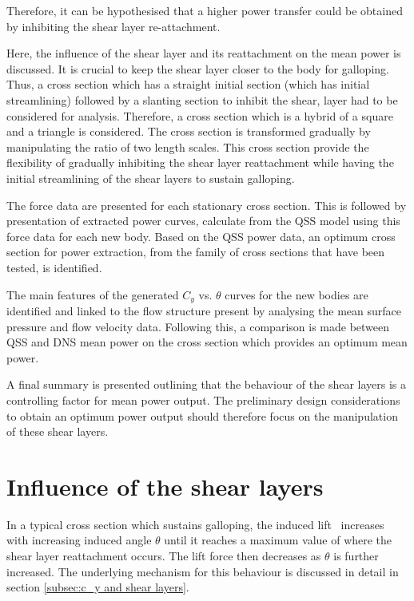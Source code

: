 Therefore, it can be hypothesised that a higher power transfer could be obtained by inhibiting the shear layer re-attachment. 

Here, the influence of the shear layer and its reattachment on the mean power is discussed. It is crucial to keep the shear layer closer to the body for galloping. Thus, a cross section which has a straight initial section (which has initial streamlining) followed by a slanting section to inhibit the shear, layer had to be considered for analysis. Therefore, a cross section which is a hybrid of a square and a triangle is considered. The cross section is transformed gradually by manipulating the ratio of two length scales. This cross section provide the flexibility of gradually inhibiting the shear layer reattachment while having the initial streamlining of the shear layers to sustain galloping. 

The force data are presented for each stationary cross section. This is followed by presentation of extracted power curves, calculate from the QSS model using this force data for each new body. Based on the QSS power data, an optimum cross section for power extraction, from the family of cross sections that have been tested, is identified.

The main features of the generated $C_y$ vs. $\theta$ curves for the
new bodies are identified and linked to the flow structure present by
analysing the mean surface pressure and flow velocity data. Following
this, a comparison is made between QSS and DNS mean power on the cross
section which provides an optimum mean power.

A final summary is presented outlining that the behaviour of the shear layers is a controlling factor for mean power output. The preliminary design considerations to obtain an optimum power output should therefore focus on the manipulation of these shear layers. 





\section{Influence of the shear layers}

In a typical cross section which sustains galloping, the induced lift \cy\ increases with increasing induced angle $\theta$ until it reaches a maximum value of \cy where the shear layer reattachment occurs. The lift force then decreases as $\theta$ is further increased. The underlying mechanism for this behaviour is discussed in detail in section \ref{subsec:c_y and shear layers}.   


